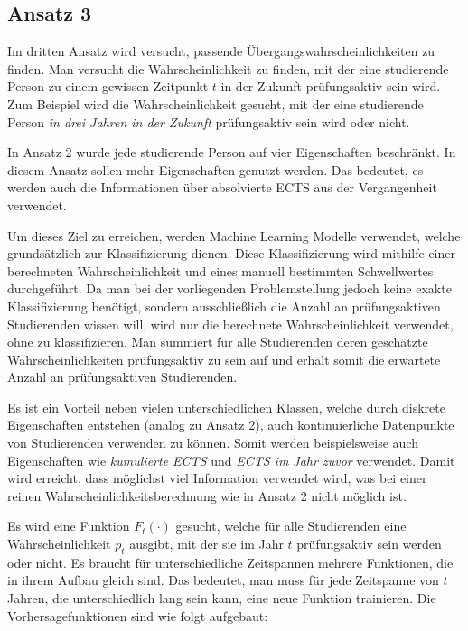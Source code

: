 \subsection{Ansatz 3}
\label{sec:appr3}
Im dritten Ansatz wird versucht, passende \"Ubergangswahrscheinlichkeiten zu finden. Man versucht die Wahrscheinlichkeit zu finden, mit der eine studierende Person zu einem
gewissen Zeitpunkt $t$ in der Zukunft pr\"ufungsaktiv sein wird.
Zum Beispiel wird die Wahrscheinlichkeit gesucht, mit der eine studierende Person \textit{in drei Jahren in der Zukunft} pr\"ufungsaktiv sein wird oder nicht.


In Ansatz 2 wurde jede studierende Person auf vier Eigenschaften beschr\"ankt.
In diesem Ansatz sollen mehr Eigenschaften genutzt werden. Das bedeutet, es werden auch die Informationen
\"uber absolvierte ECTS aus der Vergangenheit verwendet.


Um dieses Ziel zu erreichen, werden Machine Learning Modelle verwendet, welche grunds\"atzlich zur Klassifizierung dienen.
Diese Klassifizierung wird mithilfe einer berechneten Wahrscheinlichkeit und eines manuell bestimmten Schwellwertes durchgef\"uhrt.
Da man bei der vorliegenden Problemstellung jedoch keine exakte Klassifizierung ben\"otigt, sondern ausschlie{\ss}lich die Anzahl an
pr\"ufungsaktiven Studierenden wissen will, wird nur die berechnete Wahrscheinlichkeit verwendet, ohne zu klassifizieren. Man summiert f\"ur alle 
Studierenden deren gesch\"atzte Wahrscheinlichkeiten pr\"ufungsaktiv zu sein auf und erh\"alt somit die erwartete Anzahl an pr\"ufungsaktiven Studierenden.

Es ist ein Vorteil neben vielen unterschiedlichen Klassen, welche durch diskrete Eigenschaften entstehen (analog zu Ansatz 2), auch kontinuierliche Datenpunkte von
Studierenden verwenden zu k\"onnen. Somit werden beispielsweise auch Eigenschaften wie \textit{\glqq kumulierte ECTS\grqq{}} und \textit{\glqq ECTS im Jahr zuvor\grqq{}} verwendet. Damit wird erreicht, dass
m\"oglichst viel Information verwendet wird, was bei einer reinen Wahrscheinlichkeitsberechnung wie in Ansatz 2 nicht m\"oglich ist.

Es wird eine Funktion $F_t(\cdot)$ gesucht, welche f\"ur alle Studierenden eine Wahrscheinlichkeit $p_t$ ausgibt, mit der
sie im Jahr $t$ pr\"ufungsaktiv sein werden oder nicht. Es braucht f\"ur unterschiedliche Zeitspannen mehrere Funktionen, die in ihrem Aufbau gleich sind.
Das bedeutet, man muss f\"ur jede Zeitspanne von $t$ Jahren, die unterschiedlich lang sein kann, eine neue Funktion trainieren.
Die Vorhersagefunktionen sind wie folgt aufgebaut:

